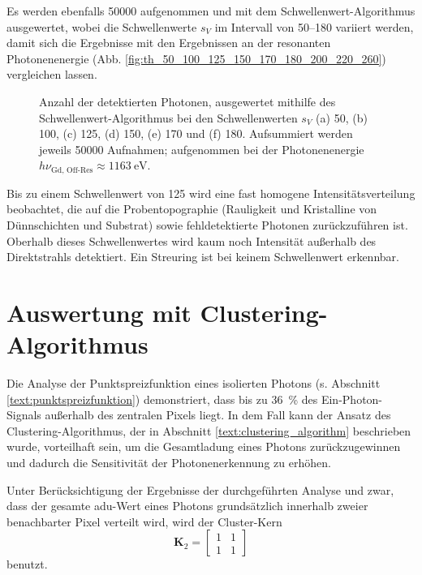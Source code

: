 \noindent
Es werden ebenfalls \SI{50000}{\captures} aufgenommen und mit dem Schwellenwert-Algorithmus ausgewertet, wobei die Schwellenwerte $s_V$ im Intervall von \SIrange{50}{180}{\adu} variiert werden, damit sich die Ergebnisse mit den Ergebnissen an der resonanten Photonenenergie (Abb. \ref{fig:th_50_100_125_150_170_180_200_220_260}) vergleichen lassen.
\begin{figure}[H]
    \centering
    
    \caption{Anzahl der detektierten Photonen, ausgewertet mithilfe des Schwellenwert-Algorithmus bei den Schwellenwerten $s_V$ (a) \SI{50}{\adu}, (b) \SI{100}{\adu}, (c) \SI{125}{\adu}, (d) \SI{150}{\adu}, (e) \SI{170}{\adu} und (f) \SI{180}{\adu}. Aufsummiert werden jeweils \num{50000} Aufnahmen; aufgenommen bei der Photonenenergie $h\nu_\text{Gd, Off-Res} \approx \SI{1163}{\eV}$.}
    \label{fig:th_50_100_125_150_170_180_off_resonance}
\end{figure}
\noindent
Bis zu einem Schwellenwert von \SI{125}{\adu} wird eine fast homogene Intensitätsverteilung beobachtet, die auf die Probentopographie (Rauligkeit und Kristalline von Dünnschichten und Substrat) sowie fehldetektierte Photonen zurückzuführen ist. Oberhalb dieses Schwellenwertes wird kaum noch Intensität außerhalb des Direktstrahls detektiert. Ein Streuring ist bei keinem Schwellenwert erkennbar.

\section{Auswertung mit Clustering-Algorithmus}
Die Analyse der Punktspreizfunktion eines isolierten Photons (s. Abschnitt \ref{text:punktspreizfunktion}) demonstriert, dass bis zu \SI{36}{\percent} des Ein-Photon-Signals außerhalb des zentralen Pixels liegt. In dem Fall kann der Ansatz des Clustering-Algorithmus, der in Abschnitt \ref{text:clustering_algorithm} beschrieben wurde, vorteilhaft sein, um die Gesamtladung eines Photons zurückzugewinnen und dadurch die Sensitivität der Photonenerkennung zu erhöhen.

\noindent
Unter Berücksichtigung der Ergebnisse der durchgeführten Analyse und zwar, dass der gesamte \gls{adu}-Wert eines Photons grundsätzlich innerhalb zweier benachbarter Pixel verteilt wird, wird der Cluster-Kern
\begin{equation}
    \mathbf{K}_2 = \begin{bmatrix}
1 & 1\\
1 & 1
\end{bmatrix}
\end{equation}
benutzt.

